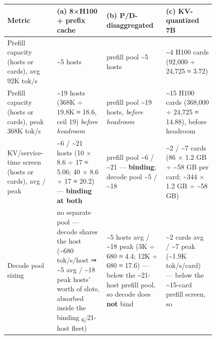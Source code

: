 \nopagebreak[4]
\begin{longtable}[]{@{}
  >{\raggedright\arraybackslash}p{0.2127\linewidth}
  >{\raggedright\arraybackslash}p{0.2127\linewidth}
  >{\raggedright\arraybackslash}p{0.2127\linewidth}
  >{\raggedright\arraybackslash}p{0.2127\linewidth}@{}}
\toprule\noalign{}
\begin{minipage}[b]{\linewidth}\raggedright
Metric
\end{minipage} & \begin{minipage}[b]{\linewidth}\raggedright
(a) 8×H100 + prefix cache
\end{minipage} & \begin{minipage}[b]{\linewidth}\raggedright
(b) P/D-disaggregated
\end{minipage} & \begin{minipage}[b]{\linewidth}\raggedright
(c) KV-quantized 7B
\end{minipage} \\
\midrule\noalign{}
\endhead
\bottomrule\noalign{}
\endlastfoot
Prefill capacity (hosts or cards), avg 92K tok/s & \textasciitilde5
hosts & prefill pool \textasciitilde5 hosts & \textasciitilde4 H100
cards (92,000 ÷ 24,725 ≈ 3.72) \\
\noalign{\label{tab:12.2}}
Prefill capacity (hosts or cards), peak 368K tok/s & \textasciitilde19
hosts (368K ÷ 19.8K ≈ 18.6, ceil 19) \emph{before headroom} & prefill
pool \textasciitilde19 hosts, \emph{before headroom} & \textasciitilde15
H100 cards (368,000 ÷ 24,725 ≈ 14.88), before headroom \\
KV/service-time screen (hosts or cards), avg / peak & \textasciitilde6 /
\textasciitilde21 hosts (10 × 8.6 ÷ 17 ≈ 5.06; 40 × 8.6 ÷ 17 ≈ 20.2) ---
\textbf{binding at both} & prefill pool \textasciitilde6 /
\textasciitilde21 --- \textbf{binding}; decode pool \textasciitilde5 /
\textasciitilde18 & \textasciitilde2 / \textasciitilde7 cards (86 × 1.2
GB ÷ \textasciitilde58 GB per card; \textasciitilde344 × 1.2 GB ÷
\textasciitilde58 GB) \\
Decode pool sizing & no separate pool --- decode shares the host
(\textasciitilde680 tok/s/host ⇒ \textasciitilde5 avg /
\textasciitilde18 peak hosts' worth of slots, absorbed inside the
binding \textsubscript{6/}21-host fleet) & \textasciitilde5 hosts avg /
\textasciitilde18 peak (3K ÷ 680 ≈ 4.4; 12K ÷ 680 ≈ 17.6) --- below the
\textasciitilde21-host prefill pool, so decode does \textbf{not} bind &
\textasciitilde2 cards avg / \textasciitilde7 peak (\textasciitilde1.9K
tok/s/card) --- below the \textasciitilde15-card prefill screen, so

\end{longtable}
